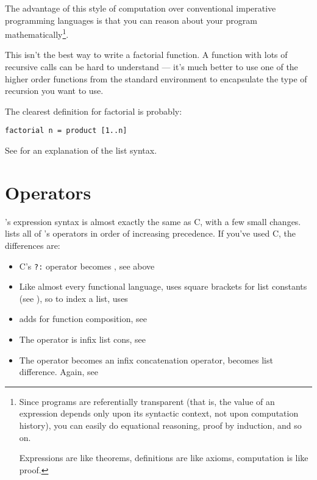 The advantage of this style of computation over conventional imperative
programming languages is that you can reason about your program
mathematically\footnote{Since programs are referentially transparent (that
is, the value of an expression depends only upon its syntactic context,
not upon computation history), you can easily do equational reasoning,
proof by induction, and so on.

Expressions are like theorems, definitions are like axioms, computation
is like proof.}. 

This isn't the best way to write a factorial function. A function with lots
of recursive calls can be hard to understand --- it's much better to use one
of the higher order functions from the standard environment to encapsulate
the type of recursion you want to use.

The clearest definition for factorial is probably:

\begin{verbatim}
factorial n = product [1..n]
\end{verbatim}

\noindent
See  for an explanation of the list syntax.

\section{Operators}

\nip{}'s expression syntax is almost exactly the same as C,
with a few small changes.  lists all of 
\nip{}'s operators in order of increasing precedence. If you've used C, the
differences are:

\begin{itemize}

\item
	C's \verb+?:+ operator becomes , see above

\item
	Like almost every functional language, \nip{} uses square brackets
	for list constants (see ), so to index a
	list, \nip{} uses 

\item
	\nip{} adds  for function composition, see 

\item
	The \ct{:} operator is infix list cons, see 

\item
	The \ct{++} operator becomes an infix concatenation operator, \ct{--}
	becomes list difference. Again, see 

\end{itemize}


